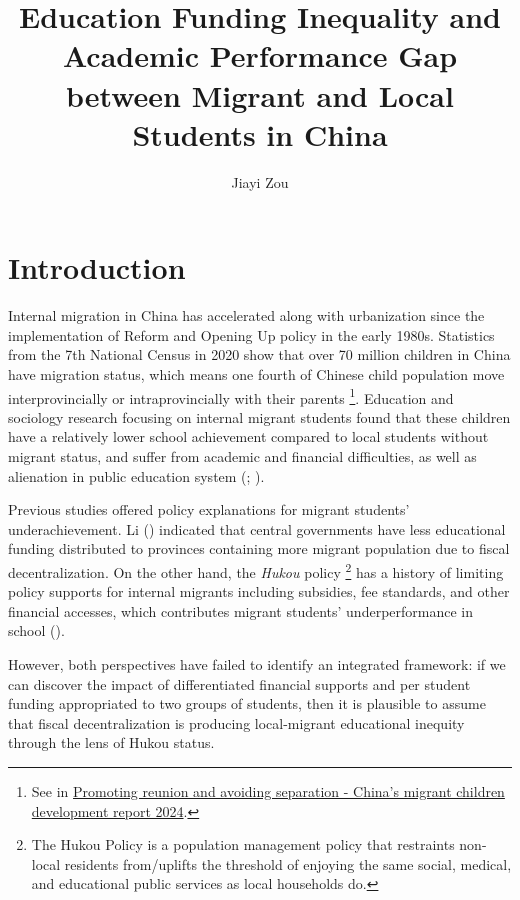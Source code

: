 \documentclass[
  man,
  floatsintext,
  longtable,
  nolmodern,
  notxfonts,
  notimes,
  colorlinks=true,linkcolor=blue,citecolor=blue,urlcolor=blue]{apa7}
\title{Education Funding Inequality and Academic Performance Gap between
Migrant and Local Students in China}
\author{Jiayi Zou}
\affiliation{
{MA Program in the Social Sciences, University of Chicago}}
\begin{document}
\maketitle


\setcounter{secnumdepth}{-\maxdimen} %

\setlength\LTleft{0pt}


\section{Introduction}\label{introduction}

Internal migration in China has accelerated along with urbanization
since the implementation of Reform and Opening Up policy in the early
1980s. Statistics from the 7th National Census in 2020 show that over 70
million children in China have migration status, which means one fourth
of Chinese child population move interprovincially or intraprovincially
with their parents \footnote{See in
  \href{https://www.163.com/dy/article/JHFCU34705560ZWH.html}{Promoting
  reunion and avoiding separation - China's migrant children development
  report 2024}.}. Education and sociology research focusing on internal
migrant students found that these children have a relatively lower
school achievement compared to local students without migrant status,
and suffer from academic and financial difficulties, as well as
alienation in public education system
(;
).

Previous studies offered policy explanations for migrant students'
underachievement. Li ()
indicated that central governments have less educational funding
distributed to provinces containing more migrant population due to
fiscal decentralization. On the other hand, the \emph{Hukou} policy
\footnote{The Hukou Policy is a population management policy that
  restraints non-local residents from/uplifts the threshold of enjoying
  the same social, medical, and educational public services as local
  households do.} has a history of limiting policy supports for internal
migrants including subsidies, fee standards, and other financial
accesses, which contributes migrant students' underperformance in school
().

However, both perspectives have failed to identify an integrated
framework: if we can discover the impact of differentiated financial
supports and per student funding appropriated to two groups of students,
then it is plausible to assume that fiscal decentralization is producing
local-migrant educational inequity through the lens of Hukou status.
\end{document}

